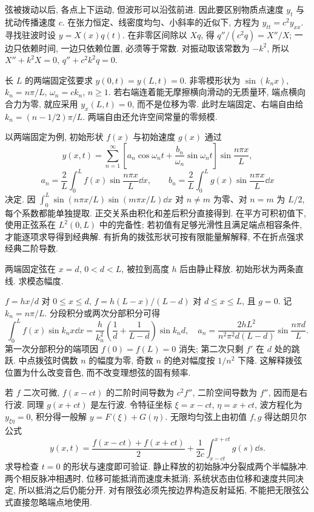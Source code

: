 \label{ch:string}
弦被拨动以后, 各点上下运动, 但波形可以沿弦前进. 因此要区别物质点速度 $y_t$ 与扰动传播速度 $c$. 在张力恒定、线密度均匀、小斜率的近似下, 方程为 $y_{tt}=c^2y_{xx}$. 寻找驻波时设 $y=X(x)q(t)$. 在非零区间除以 $Xq$, 得 $q''/(c^2q)=X''/X$; 一边只依赖时间, 一边只依赖位置, 必须等于常数. 对振动取该常数为 $-k^2$, 所以 $X''+k^2X=0$, $q''+c^2k^2q=0$.

长 $L$ 的两端固定弦要求 $y(0,t)=y(L,t)=0$. 非零模形状为 $\sin(k_nx)$, $k_n=n\pi/L$, $\omega_n=ck_n$, $n\ge1$. 若右端连着能无摩擦横向滑动的无质量环, 端点横向合力为零, 就应采用 $y_x(L,t)=0$, 而不是位移为零. 此时左端固定、右端自由给 $k_n=(n-1/2)\pi/L$. 两端自由还允许空间常量的零频模.

以两端固定为例, 初始形状 $f(x)$ 与初始速度 $g(x)$ 通过
\begin{equation}\label{eq:string-series}
y(x,t)=\sum_{n=1}^{\infty}\left[a_n\cos\omega_nt+
\frac{b_n}{\omega_n}\sin\omega_nt\right]\sin\frac{n\pi x}{L},
\end{equation}
\[
a_n=\frac2L\int_0^Lf(x)\sin\frac{n\pi x}{L}\dd x,\qquad
b_n=\frac2L\int_0^Lg(x)\sin\frac{n\pi x}{L}\dd x
\]
决定. 因 $\int_0^L\sin(n\pi x/L)\sin(m\pi x/L)\dd x$ 对 $n\ne m$ 为零、对 $n=m$ 为 $L/2$, 每个系数都能单独提取. 正交关系由积化和差后积分直接得到. 在平方可积初值下, 使用正弦系在 $L^2(0,L)$ 中的完备性; 若初值有足够光滑性且满足端点相容条件, 才能逐项求导得到经典解. 有折角的拨弦形状可按有限能量解解释, 不在折点强求经典二阶导数.

\begin{example}
两端固定弦在 $x=d$, $0<d<L$, 被拉到高度 $h$ 后由静止释放. 初始形状为两条直线. 求模态幅度.
\end{example}
\begin{solution}
$f=hx/d$ 对 $0\le x\le d$, $f=h(L-x)/(L-d)$ 对 $d\le x\le L$, 且 $g=0$. 记 $k_n=n\pi/L$. 分段积分或两次分部积分可得
\[
\int_0^Lf(x)\sin k_nx\dd x
=\frac{h}{k_n^2}\left(\frac1d+\frac1{L-d}\right)\sin k_nd,
\quad
 a_n=\frac{2hL^2}{n^2\pi^2d(L-d)}\sin\frac{n\pi d}{L}.
\]
第一次分部积分的端项因 $f(0)=f(L)=0$ 消失; 第二次只剩 $f'$ 在 $d$ 处的跳跃. 中点拨弦时偶数 $n$ 的幅度为零, 奇数 $n$ 的绝对幅度按 $1/n^2$ 下降. 这解释拨弦位置为什么改变音色, 而不改变理想弦的固有频率.
\end{solution}

若 $f$ 二次可微, $f(x-ct)$ 的二阶时间导数为 $c^2f''$, 二阶空间导数为 $f''$, 因而是右行波. 同理 $g(x+ct)$ 是左行波. 令特征坐标 $\xi=x-ct$, $\eta=x+ct$, 波方程化为 $y_{\xi\eta}=0$, 积分得一般解 $y=F(\xi)+G(\eta)$. 无限均匀弦上由初值 $f,g$ 得达朗贝尔公式
\begin{equation}\label{eq:dalembert}
y(x,t)=\frac{f(x-ct)+f(x+ct)}2+
\frac1{2c}\int_{x-ct}^{x+ct}g(s)\dd s.
\end{equation}
求导检查 $t=0$ 的形状与速度即可验证. 静止释放的初始脉冲分裂成两个半幅脉冲. 两个相反脉冲相遇时, 位移可能抵消而速度未抵消; 系统状态由位移和速度共同决定, 所以抵消之后仍能分开. 对有限弦必须先按边界构造反射延拓, 不能把无限弦公式直接忽略端点地使用.

